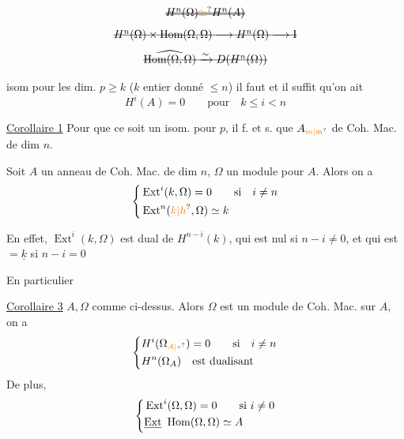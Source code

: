 
\[
\deleted{\deleted{H^n(\Omega)\unsure{\simeq} H^n(A)}}
\]
\[
\deleted{H^n(\Omega)\times\operatorname{Hom}(\Omega,\Omega)\longrightarrow H^n(\Omega)\longrightarrow\mathrm I}
\]
\[
\deleted{\widehat{\operatorname{Hom}(\Omega,\Omega)}\xrightarrow{\sim}D(H^n(\Omega))}
\]



\noindent\llap{\smash{\raisebox{-0.7\baselineskip}{\rule{0.4pt}{1.6\baselineskip}}}\quad}
isom pour les dim. $p\geq k$ ($k$ entier donné $\leq n$)
il faut et il suffit qu'on ait
\[
H^i(A)=0\qquad\text{pour}\quad k\leq i<n
\]

\noindent\llap{\smash{\raisebox{-2.1\baselineskip}{\rule{0.4pt}{2.2\baselineskip}}}\quad}
\uline{Corollaire 1} Pour que ce soit un isom. pour
 $p$, il f. et s. que  $A_{\unsure{m|\mathfrak m}}$  
  de Coh. Mac. de dim $n$.


 Soit $A$ un anneau  de Coh.
Mac. de dim $n$, $\Omega$ un module 
pour $A$. Alors on a
\[
\left\{\begin{aligned}
&\operatorname{Ext}^i(k,\Omega)=0\qquad \text{si}\quad i\ne n\\
&\operatorname{Ext}^n(\unsure{k|h},\Omega)\simeq k
\end{aligned}\right.
\]

\margin{\unsure{\S|$\{$}}
En effet, $\operatorname{Ext}^i(k,\Omega)$ est dual de $H^{n-i}(k)$, qui
est nul si $n-i\ne0$, et qui est $=\underline{k}$ si $n-i=0$

En particulier

\uline{Corollaire 3} $A,\Omega$ comme ci-dessus. Alors $\Omega$
est un module de Coh. Mac.  sur $A$, on a
\[
\left\{\begin{aligned}
&H^i(\Omega_{\unsure{A|*}})=0\qquad \text{si}\quad i\ne n\\
&H^n(\Omega_A)\quad\text{est dualisant}
\end{aligned}\right.
\]
De plus, 
\[
\left\{\begin{aligned}
&\operatorname{Ext}^i(\Omega,\Omega)=0\qquad\text{si }i\ne0\\
&\deleted{\operatorname{Ext}}\ \operatorname{Hom}(\Omega,\Omega)\simeq A
\end{aligned}\right.
\]

